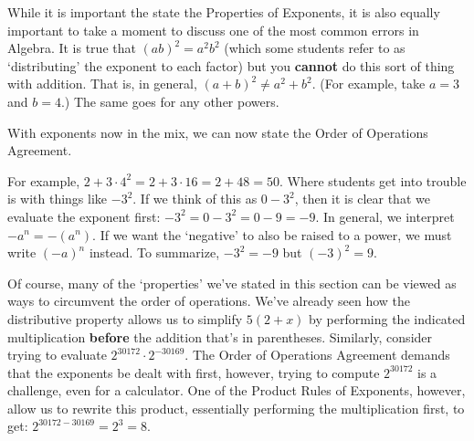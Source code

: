 While it is important the state the Properties of Exponents, it is also equally important to take a moment to discuss one of the most common errors in Algebra.  It is true that $(ab)^2 = a^2 b^2$ (which some students refer to as `distributing' the exponent to each factor) but you {\bf cannot} do this sort of thing with addition.  That is, in general,   $(a+b)^2 \neq a^2 + b^2$. (For example, take $a= 3$ and $b = 4$.)  The same goes for any other powers.

\smallskip

With exponents now in the mix, we can now state the Order of Operations Agreement.

\medskip



\medskip

For example, $2 + 3\cdot 4^2 = 2 + 3\cdot 16 = 2 + 48 = 50$.  Where students get into trouble is with things like $-3^2$.  If we think of this as $0 - 3^2$, then it is clear that we evaluate the exponent first:  $-3^2 =0 -3^2 =0 -9 = -9$.  In general, we interpret $-a^n = -\left(a^n\right)$.  If we want the `negative' to also be raised to a power, we must  write $(-a)^n$ instead.  To summarize, $-3^2 = -9$ but $(-3)^2  = 9$. 

\smallskip

Of course, many of the `properties' we've stated in this section can be viewed as ways to circumvent the order of operations. We've already seen how the distributive property allows us to simplify $5(2+x)$ by performing the indicated multiplication \textbf{before} the addition that's in parentheses.  Similarly, consider trying to evaluate $2^{30172}\cdot 2^{-30169}$.  The Order of Operations Agreement demands that the exponents be dealt with first, however, trying to compute $2^{30172}$ is a challenge, even for a calculator.  One of the Product Rules of Exponents, however, allow us to rewrite this product, essentially performing the multiplication first, to get:  $2^{30172-30169} = 2^{3} = 8$.  

